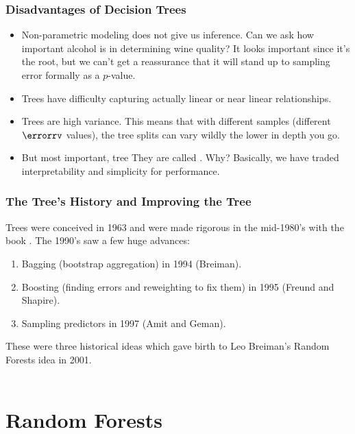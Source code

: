 \documentclass[handout]{beamer}
\begin{document}
\begin{frame}\frametitle{Disadvantages of Decision Trees}

\begin{itemize}
\item Non-parametric modeling does not give us inference. Can we ask how important alcohol is in determining wine quality? It looks important since it's the root, but we can't get a reassurance that it will stand up to sampling error formally as a $p$-value. \pause
\item Trees have difficulty capturing actually linear or near linear relationships. \pause
\item Trees are high variance. \pause This means that with different samples (different $\errorrv$ values), the tree splits can vary wildly the lower in depth you go.
\item But most important, tree  They are called . Why? \pause Basically, we have traded interpretability and simplicity for performance.
\end{itemize}

\end{frame}

\begin{frame}\frametitle{The Tree's History and Improving the Tree}

Trees were conceived in 1963 and were made rigorous in the mid-1980's with the book . The 1990's saw a few huge advances:

\begin{enumerate}
\item Bagging (bootstrap aggregation) in 1994 (Breiman).
\item Boosting (finding errors and reweighting to fix them) in 1995 (Freund and Shapire).
\item Sampling predictors in 1997 (Amit and Geman).
\end{enumerate}

These were three historical ideas which gave birth to Leo Breiman's Random Forests idea in 2001.\\~\\ \pause 


	
\end{frame}


\section{Random Forests}
\end{document}
